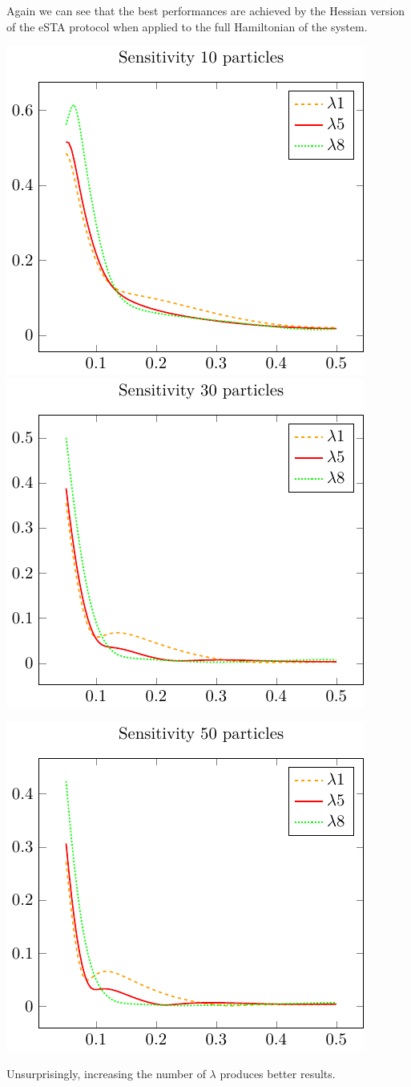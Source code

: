 \documentclass{article}
\begin{document}
Again we can see that the best performances are achieved by the Hessian version of the eSTA protocol when applied to the full Hamiltonian of the system.

\includegraphics{./gfx/sensitivity_compare10.pdf}
\includegraphics{./gfx/sensitivity_compare30.pdf}

\begin{center}
	\includegraphics{./gfx/sensitivity_compare50.pdf}
\end{center}

Unsurprisingly, increasing the number of $ \lambda $ produces better results.

\end{document}
